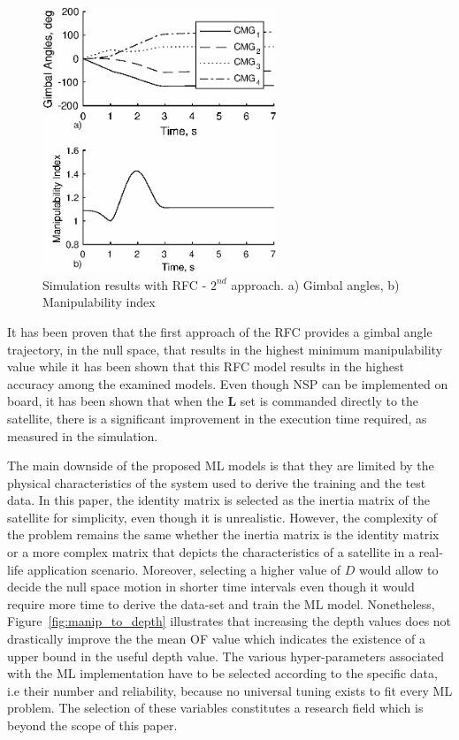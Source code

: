 \documentclass[aerospace,article,submit,moreauthors,dvi2pdf]{Definitions/mdpi}
\begin{document}
\begin{figure}[H]
\includegraphics[width=7cm]{chara9.eps}
\caption{\label{fig:predRFC2}Simulation results with RFC - $2^{nd}$ approach. a) Gimbal angles, b) Manipulability index}
\end{figure}
It has been proven that the first approach of the RFC provides a gimbal angle trajectory, in the null space, that results in the highest minimum manipulability value while it has been shown that this RFC model results in the highest accuracy among the examined models. Even though NSP can be implemented on board, it has been shown that when the $\textbf{L}$ set is commanded directly to the satellite, there is a significant improvement in the execution time required, as measured in the simulation. 

The main downside of the proposed ML models is that they are limited by the physical characteristics of the system used to derive the training and the test data. In this paper, the identity matrix is selected as the inertia matrix of the satellite for simplicity, even though it is unrealistic. However, the complexity of the problem remains the same whether the inertia matrix is the identity matrix or a more complex matrix that depicts the characteristics of a satellite in a real-life application scenario. 
Moreover, selecting a higher value of $D$ would allow to decide the null space motion in shorter time intervals even though it would require more time to derive the data-set and train the ML model. Nonetheless, Figure~\ref{fig:manip_to_depth} illustrates that increasing the depth values does not drastically improve the the mean OF value which indicates the existence of a upper bound in the useful depth value.
The various hyper-parameters associated with the ML implementation have to be selected according to the specific data, i.e their number and reliability, because no universal tuning exists to fit every ML problem. The selection of these variables constitutes a research field which is beyond the scope of this paper. 
\end{document}
